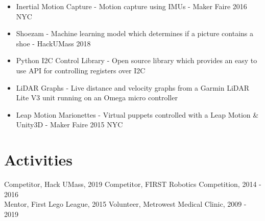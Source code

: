 \documentclass[10pt]{article}
\begin{document}
\begin{flushleft}
\begin{itemize}
		\item Inertial Motion Capture - Motion capture using IMUs - Maker Faire 2016 NYC

		\item Shoezam - Machine learning model which determines if a picture contains a shoe - HackUMass 2018

		\item Python I2C Control Library - Open source library which provides an easy to use API for controlling 
			registers over I2C

		\item LiDAR Graphs - Live distance and velocity graphs from a Garmin LiDAR Lite V3 unit running on an 
			Omega micro controller

		\item Leap Motion Marionettes - Virtual puppets controlled with a Leap Motion \& Unity3D - Maker Faire 2015 NYC
	\end{itemize}

\section{Activities}
	Competitor, Hack UMass, 2019 \hfill Competitor, FIRST Robotics Competition, 2014 - 2016 \\
	Mentor, First Lego League, 2015 \hfill Volunteer, Metrowest Medical Clinic, 2009 - 2019


\end{flushleft}
\end{document}
